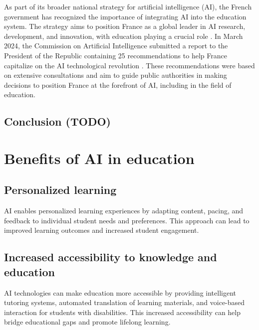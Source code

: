 \documentclass{article}
\begin{document}
As part of its broader national strategy for artificial intelligence (AI), the French government has recognized the importance of integrating AI into the education system. The strategy aims to position France as a global leader in AI research, development, and innovation, with education playing a crucial role \cite{https://www.economie.gouv.fr/strategie-nationale-intelligence-artificielle} \cite{https://www.entreprises.gouv.fr/fr/numerique/enjeux/la-strategie-nationale-pour-l-ia}. In March 2024, the Commission on Artificial Intelligence submitted a report to the President of the Republic containing 25 recommendations to help France capitalize on the AI technological revolution \cite{https://edunumrech.hypotheses.org/11602} \cite{https://www.ac-paris.fr/l-intelligence-artificielle-dans-l-education-130992} \cite{https://www.campusmatin.com/numerique/equipements-systemes-informations/commission-ia-les-recommandations-pour-l-enseignement-superieur-et-la-recherche.html}. These recommendations were based on extensive consultations and aim to guide public authorities in making decisions to position France at the forefront of AI, including in the field of education.




\subsection{Conclusion (TODO)} %

\newpage
\section{Benefits of AI in education}

\subsection{Personalized learning}
AI enables personalized learning experiences by adapting content, pacing, and feedback to individual student needs and preferences. This approach can lead to improved learning outcomes and increased student engagement.

\subsection{Increased accessibility to knowledge and education}
AI technologies can make education more accessible by providing intelligent tutoring systems, automated translation of learning materials, and voice-based interaction for students with disabilities. This increased accessibility can help bridge educational gaps and promote lifelong learning.
\end{document}
